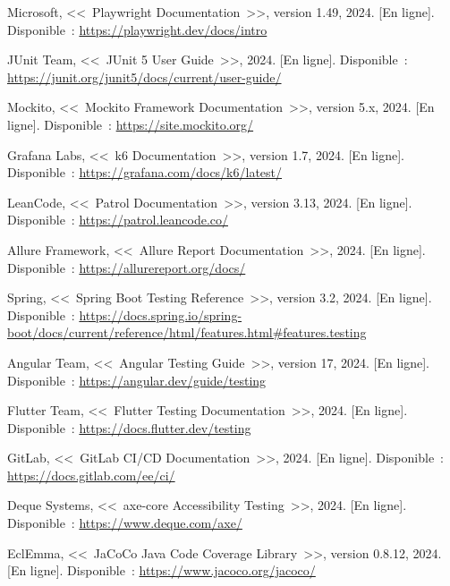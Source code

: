 \begin{enumerate}[label={[\arabic*]}, leftmargin=2cm, resume]

\item \label{bib:playwright} Microsoft, <<~Playwright Documentation~>>,
  version 1.49, 2024. [En ligne]. Disponible~:
  \url{https://playwright.dev/docs/intro}

\item \label{bib:junit5} JUnit Team, <<~JUnit 5 User Guide~>>, 2024.
  [En ligne]. Disponible~:
  \url{https://junit.org/junit5/docs/current/user-guide/}

\item \label{bib:mockito} Mockito, <<~Mockito Framework Documentation~>>,
  version 5.x, 2024. [En ligne]. Disponible~:
  \url{https://site.mockito.org/}

\item \label{bib:k6} Grafana Labs, <<~k6 Documentation~>>, version 1.7, 2024.
  [En ligne]. Disponible~:
  \url{https://grafana.com/docs/k6/latest/}

\item \label{bib:patrol} LeanCode, <<~Patrol Documentation~>>, version 3.13,
  2024. [En ligne]. Disponible~:
  \url{https://patrol.leancode.co/}

\item \label{bib:allure} Allure Framework, <<~Allure Report Documentation~>>,
  2024. [En ligne]. Disponible~:
  \url{https://allurereport.org/docs/}

\item \label{bib:springboot} Spring, <<~Spring Boot Testing Reference~>>,
  version 3.2, 2024. [En ligne]. Disponible~:
  \url{https://docs.spring.io/spring-boot/docs/current/reference/html/features.html\#features.testing}

\item \label{bib:angular-testing} Angular Team, <<~Angular Testing Guide~>>,
  version 17, 2024. [En ligne]. Disponible~:
  \url{https://angular.dev/guide/testing}

\item \label{bib:flutter-testing} Flutter Team, <<~Flutter Testing Documentation~>>,
  2024. [En ligne]. Disponible~:
  \url{https://docs.flutter.dev/testing}

\item \label{bib:gitlab-ci} GitLab, <<~GitLab CI/CD Documentation~>>, 2024.
  [En ligne]. Disponible~:
  \url{https://docs.gitlab.com/ee/ci/}

\item \label{bib:axecore} Deque Systems, <<~axe-core Accessibility Testing~>>,
  2024. [En ligne]. Disponible~:
  \url{https://www.deque.com/axe/}

\item \label{bib:jacoco} EclEmma, <<~JaCoCo Java Code Coverage Library~>>,
  version 0.8.12, 2024. [En ligne]. Disponible~:
  \url{https://www.jacoco.org/jacoco/}

\end{enumerate}
